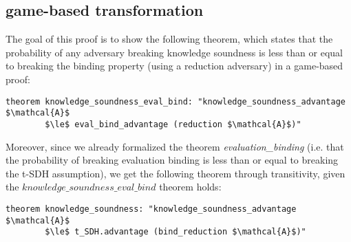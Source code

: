 \subsection{game-based transformation}
\label{security:knowledge:gamebased}
The goal of this proof is to show the following theorem, which states that the probability of any adversary breaking  knowledge soundness is less than or equal to breaking the binding property (using a reduction adversary) in a game-based proof:
\begin{lstlisting}[language=isabelle]
    theorem knowledge_soundness_eval_bind: "knowledge_soundness_advantage $\mathcal{A}$ 
        $\le$ eval_bind_advantage (reduction $\mathcal{A}$)"
\end{lstlisting}
Moreover, since we already formalized the theorem \textit{evaluation\_binding} (i.e. that the probability of breaking evaluation binding is less than or equal to breaking the t-SDH assumption), we get the following theorem through transitivity, given the $knowledge\_soundness\_eval\_bind$ theorem holds: 

\begin{lstlisting}[language=isabelle]
    theorem knowledge_soundness: "knowledge_soundness_advantage $\mathcal{A}$ 
        $\le$ t_SDH.advantage (bind_reduction $\mathcal{A}$)"
\end{lstlisting}

